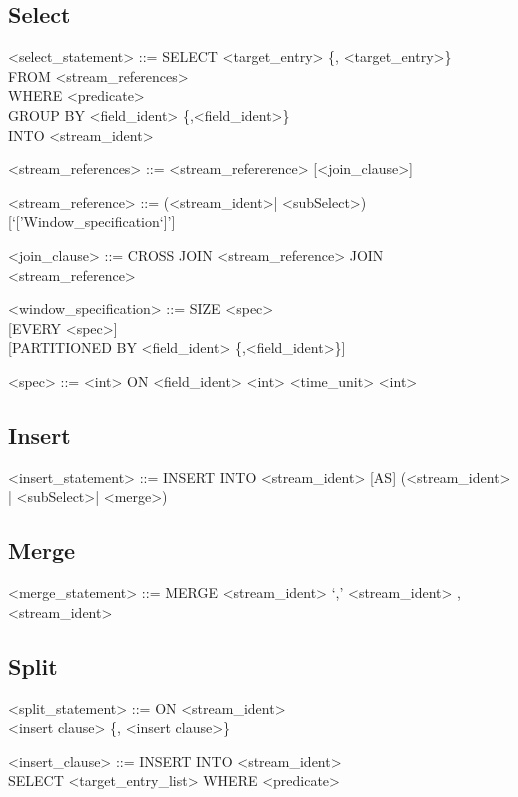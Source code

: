\documentclass{article}
\begin{document}
\subsection{Select}
\begin{grammar}
<select_statement> ::= SELECT <target_entry> \{, <target_entry>\}\\
	FROM <stream_references> \\
	WHERE <predicate> \\
	GROUP BY <field_ident> \{,<field_ident>\} \\
	INTO <stream_ident>
	
<stream_references> ::= <stream_refererence> [<join_clause>]

<stream_reference> ::= (<stream_ident>| <subSelect>) [`['Window_specification`]']

<join_clause> ::= CROSS JOIN <stream_reference>
				\alt [INNER] JOIN <stream_reference>

<window_specification> ::= 
								SIZE <spec> \\
								{ }[EVERY <spec>]\\
								{ }[PARTITIONED BY <field_ident> \{,<field_ident>\}]

<spec> ::= <int> ON <field_ident>
			\alt <int> <time_unit>
			\alt <int>
\end{grammar}


\subsection{Insert}

\begin{grammar}
<insert_statement> ::= INSERT INTO <stream_ident> [AS] 
							(<stream_ident> | <subSelect>| <merge>)
\end{grammar}


\subsection{Merge}
\begin{grammar}
<merge_statement> ::= MERGE <stream_ident> `,' <stream_ident> {,<stream_ident>}
\end{grammar}

\subsection{Split}
\begin{grammar}
<split_statement> ::= ON <stream_ident> \\
						<insert clause> \{, <insert clause>\}
						
<insert_clause> ::= INSERT INTO <stream_ident> \\SELECT <target_entry_list> WHERE <predicate>
\end{grammar}
\end{document}
